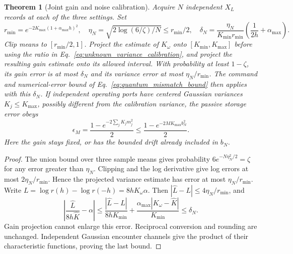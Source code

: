 \documentclass[11pt]{article}
\newtheorem{theorem}{Theorem}[section]
\theoremstyle{definition}
\theoremstyle{remark}
\begin{document}
\begin{theorem}[Joint gain and noise calibration]
\label{thm:unknown_variance_certificate}
Acquire $N$ independent $X_L$ records at each of the three settings.
Set
\[
 r_{\min}=e^{-2K_{\max}(1+\alpha_{\max}h)^2},\quad
 \eta_N=\sqrt{2\log(6/\zeta)/N}\le r_{\min}/2,\quad
 \delta_N=\frac{\eta_N}{K_{\min}r_{\min}}
                \left(\frac1{2h}+\alpha_{\max}\right).
\]
Clip means to $[r_{\min}/2,1]$. Project the estimate of $K_\omega$
onto $[K_{\min},K_{\max}]$ before using the ratio in
Eq.~\eqref{eq:unknown_variance_calibration}, and project the resulting
gain estimate onto its allowed interval. With probability at least
$1-\zeta$, its gain error is at most $\delta_N$ and its variance error
at most $\eta_N/r_{\min}$. The command and numerical-error bound of
Eq.~\eqref{eq:quantum_mismatch_bound} then applies with this $\delta_N$.
If independent operating ports have centered Gaussian variances
$K_j\le K_{\max}$, possibly different from the calibration variance,
the passive storage error obeys
\begin{equation}
 \epsilon_M=\frac{1-e^{-2\sum_j K_j m_j^2}}2
     \le\frac{1-e^{-2M K_{\max}b_N^2}}2.
 \label{eq:thermal_lifetime}
\end{equation}
Here the gain stays fixed, or has the bounded drift already included
in $b_N$.
\end{theorem}
\begin{proof}
The union bound over three sample means gives probability
$6e^{-N\eta_N^2/2}=\zeta$ for any error greater than $\eta_N$.
Clipping and the log derivative give log errors at most
$2\eta_N/r_{\min}$. Hence the projected variance estimate has error
at most $\eta_N/r_{\min}$. Write
$L=\log r(h)-\log r(-h)=8hK_\omega\alpha$.
Then $|\widehat L-L|\le4\eta_N/r_{\min}$, and
\[
 \left|\frac{\widehat L}{8h\widehat K}-\alpha\right|
 \le\frac{|\widehat L-L|}{8hK_{\min}}
       +\frac{\alpha_{\max}|K_\omega-\widehat K|}{K_{\min}}
 \le\delta_N.
\]
Gain projection cannot enlarge this error. Reciprocal conversion and
rounding are unchanged. Independent Gaussian encounter channels give
the product of their characteristic functions, proving the last bound.
\end{proof}
\end{document}
